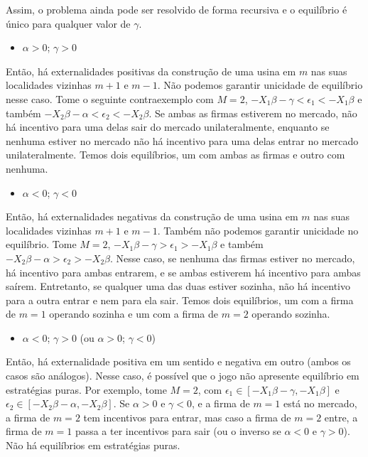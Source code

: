 \documentclass{article}
\begin{document}
Assim, o problema ainda pode ser resolvido de forma recursiva e o equilíbrio é único para qualquer valor de $\gamma$.


\begin{itemize}
    \item $\alpha > 0$; $\gamma > 0$
\end{itemize}

Então, há externalidades positivas da construção de uma usina em $m$ nas suas localidades vizinhas $m+1$ e $m-1$. Não podemos garantir unicidade de equilíbrio nesse caso. Tome o seguinte contraexemplo com $M = 2$, $-X_1 \beta - \gamma < \epsilon_1 < -X_1 \beta$ e também $-X_2 \beta - \alpha < \epsilon_2 < -X_2 \beta$. Se ambas as firmas estiverem no mercado, não há incentivo para uma delas sair do mercado unilateralmente, enquanto se nenhuma estiver no mercado não há incentivo para uma delas entrar no mercado unilateralmente. Temos dois equilíbrios, um com ambas as firmas e outro com nenhuma.

\begin{itemize}
    \item $\alpha < 0$; $\gamma < 0$
\end{itemize}

Então, há externalidades negativas da construção de uma usina em $m$ nas suas localidades vizinhas $m+1$ e $m-1$. Também não podemos garantir unicidade no equilíbrio. Tome $M = 2$, $-X_1 \beta - \gamma > \epsilon_1 > -X_1 \beta$ e também $-X_2 \beta - \alpha > \epsilon_2 > -X_2 \beta$. Nesse caso, se nenhuma das firmas estiver no mercado, há incentivo para ambas entrarem, e se ambas estiverem há incentivo para ambas saírem. Entretanto, se qualquer uma das duas estiver sozinha, não há incentivo para a outra entrar e nem para ela sair. Temos dois equilíbrios, um com a firma de $m=1$ operando sozinha e um com a firma de $m=2$ operando sozinha.

\begin{itemize}
    \item $\alpha < 0$; $\gamma > 0$ (ou $\alpha > 0$; $\gamma < 0$)
\end{itemize}

Então, há externalidade positiva em um sentido e negativa em outro (ambos os casos são análogos). Nesse caso, é possível que o jogo não apresente equilíbrio em estratégias puras. Por exemplo, tome $M = 2$, com $\epsilon_1 \in [-X_1 \beta - \gamma, -X_1 \beta]$ e $\epsilon_2 \in [-X_2 \beta - \alpha, -X_2 \beta]$. Se $\alpha > 0$ e $\gamma < 0$, e a firma de $m=1$ está no mercado, a firma de $m = 2$ tem incentivos para entrar, mas caso a firma de $m=2$ entre, a firma de $m=1$ passa a ter incentivos para sair (ou o inverso se $\alpha < 0$ e $\gamma > 0$). Não há equilíbrios em estratégias puras.
\end{document}
